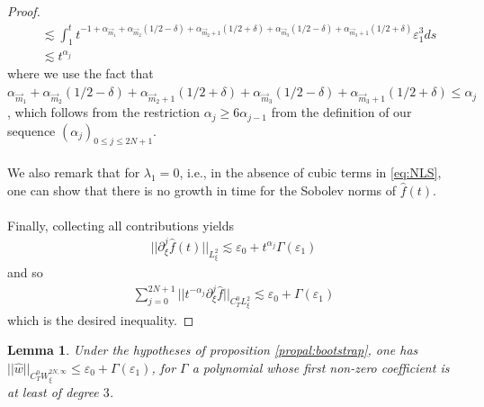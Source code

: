 \documentclass[a4paper, 15pt]{article}
\numberwithin{equation}{section}
\newtheorem{lem}[defi]{Lemma}
\begin{document}
\begin{proof}
\begin{align*}
&\lesssim \int^t_1t^{-1+\alpha_{\overrightarrow{m}_1}+\alpha_{\overrightarrow{m}_2}(1/2-\delta)+\alpha_{\overrightarrow{m}_2+1}(1/2+\delta)+\alpha_{\overrightarrow{m}_3}(1/2-\delta)+\alpha_{\overrightarrow{m}_3+1}(1/2+\delta)}\varepsilon_{1}^3ds\\
&\lesssim t^{\alpha_j}
\end{align*}
where we use the fact that $\alpha_{\overrightarrow{m}_1}+\alpha_{\overrightarrow{m}_2}(1/2-\delta)+\alpha_{\overrightarrow{m}_2+1}(1/2+\delta)+\alpha_{\overrightarrow{m}_3}(1/2-\delta)+\alpha_{\overrightarrow{m}_3+1}(1/2+\delta)\leq \alpha_j$, which follows from the restriction $\alpha_j\geq 6\alpha_{j-1}$ from the definition of our sequence $(\alpha_j)_{0\leq j\leq 2N+1}$.\\\\
We also remark that for $\lambda_1=0$, i.e., in the absence of cubic terms in \eqref{eq:NLS}, one can show that there is no growth in time for the Sobolev norms of $\hat{f}(t)$. \\\\
Finally, collecting all contributions yields
\begin{align*}
||\partial^{j}_\xi\hat{f}(t)||_{L^2_\xi}\lesssim \varepsilon_0+t^{\alpha_j}\Gamma(\varepsilon_1)
\end{align*}
and so
\begin{align*}
\sum^{2N+1}_{j=0}||t^{-\alpha_j}\partial^{j}_\xi\hat{f}||_{C^0_TL^2_\xi}\lesssim \varepsilon_0+\Gamma(\varepsilon_1)
\end{align*}
which is the desired inequality. 
\end{proof}
\begin{lem}
\label{lem:bootstrapwlem}
Under the hypotheses of proposition \ref{propal:bootstrap}, one has $||\hat{w}||_{C^0_TW^{2N,\infty}_\xi}\leq\varepsilon_0 +\Gamma(\varepsilon_1)$,
for $\Gamma$ a polynomial whose first non-zero coefficient is at least of degree $3$.
\end{lem}
\end{document}

